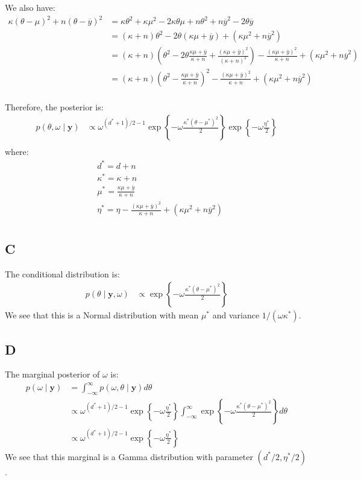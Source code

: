 \documentclass{article}
\begin{document}
We also have:
\begin{align*}
\kappa(\theta-\mu)^2 + n (\theta - \overline{y})^2 &= \kappa\theta^2 + \kappa\mu^2 - 2\kappa\theta\mu + n\theta^2 + n\overline{y}^2 - 2\theta\overline{y}\\
&= (\kappa + n)\theta^2 - 2\theta(\kappa\mu + \overline{y}) + (\kappa\mu^2 + n\overline{y}^2)\\
&=(\kappa+n)\left( \theta^2 - 2 \theta \frac{\kappa\mu + \overline{y}}{\kappa + n} + \frac{(\kappa\mu + \overline{y})^2}{(\kappa + n)^2} \right) - \frac{(\kappa\mu + \overline{y})^2}{\kappa + n} + (\kappa\mu^2 + n\overline{y}^2)\\
&= (\kappa+n)\left( \theta^2 -\frac{\kappa\mu + \overline{y}}{\kappa + n}\right)^2 - \frac{(\kappa\mu + \overline{y})^2}{\kappa + n} + (\kappa\mu^2 + n\overline{y}^2)\\
\end{align*}


Therefore, the posterior is:
\begin{align*}
p(\theta, \omega \mid \mathbf{y}) &\propto \omega^{(d^*+1)/2 - 1} \exp\left\lbrace - \omega \frac{\kappa^*(\theta-\mu^*)^2}{2} \right\rbrace \exp\left\lbrace -\omega \frac{\eta^*}{2}\right\rbrace\\
\end{align*}
where:
\begin{align*}
&d^* = d + n\\
&\kappa^* = \kappa + n\\
&\mu^* = \frac{\kappa\mu + \overline{y}}{\kappa + n}\\
&\eta^* = \eta - \frac{(\kappa\mu + \overline{y})^2}{\kappa + n} + (\kappa\mu^2 + n\overline{y}^2)\\
\end{align*}

\subsection*{C}
The conditional distribution is:
\begin{align*}
p(\theta \mid \mathbf{y}, \omega) &\propto \exp\left\lbrace - \omega \frac{\kappa^*(\theta-\mu^*)^2}{2} \right\rbrace
\end{align*}
We see that this is a Normal distribution with mean \(\mu^*\) and variance \(1/(\omega\kappa^*)\).

\subsection*{D}
The marginal posterior of \(\omega\) is:
\begin{align*}
p(\omega \mid \mathbf{y}) &= \int_{-\infty}^{\infty} p(\omega, \theta \mid \mathbf{y}) d\theta\\
&\propto \omega^{(d^*+1)/2 - 1}\exp\left\lbrace -\omega \frac{\eta^*}{2}\right\rbrace \int_{-\infty}^{\infty} \exp\left\lbrace - \omega \frac{\kappa^*(\theta-\mu^*)^2}{2} \right\rbrace d\theta\\
&\propto \omega^{(d^*+1)/2 - 1}\exp\left\lbrace -\omega \frac{\eta^*}{2}\right\rbrace \tag{Gaussian integral}
\end{align*}
We see that this marginal is a Gamma distribution with parameter \((d^*/2, \eta^*/2)\).
\end{document}

